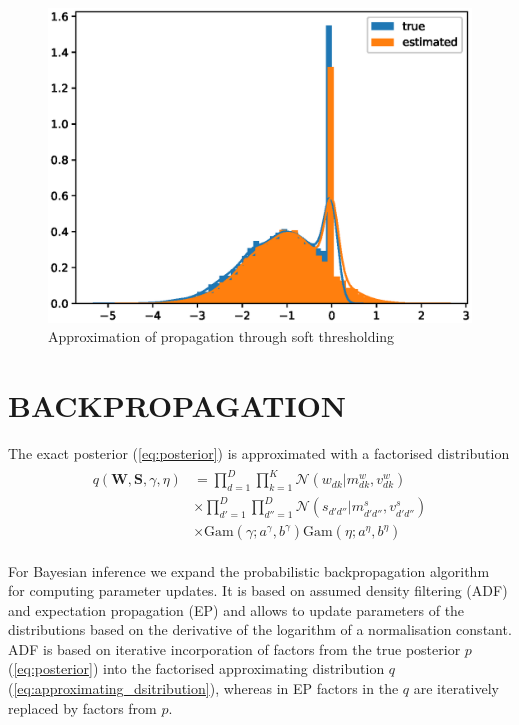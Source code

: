 \documentclass[letterpaper]{article}
\begin{document}
\begin{figure}[t]
\includegraphics[width=\columnwidth]{z_new_testing}
\caption{Approximation of propagation through soft thresholding}
\label{fig:z_new_testing}
\end{figure}


\section{\uppercase{Backpropagation}}
\label{sec:backpropagation}

The exact posterior (\ref{eq:posterior}) is approximated with a factorised distribution
\begin{align}
\label{eq:approximating_dsitribution}
\begin{split}
q(\mathbf{W}, \mathbf{S}, \gamma, \eta) &= \prod_{d=1}^D\prod_{k=1}^K \mathcal{N}(w_{dk} | m^w_{dk}, v^w_{dk}) \\
&\times \prod_{d'=1}^D\prod_{d''=1}^D \mathcal{N}(s_{d'd''} | m^s_{d'd''}, v^s_{d'd''}) \\
&\times \text{Gam}(\gamma; a^\gamma, b^\gamma) \text{Gam}(\eta; a^\eta, b^\eta) 
\end{split}
\end{align}

For Bayesian inference we expand the probabilistic backpropagation algorithm~\citep{hernandez2015probabilistic} for computing parameter updates. It is based on assumed density filtering (ADF) and expectation propagation (EP) and allows to update parameters of the distributions based on the derivative of the logarithm of a normalisation constant. ADF is based on iterative incorporation of factors from the true posterior $p$ (\ref{eq:posterior}) into the factorised approximating distribution $q$ (\ref{eq:approximating_dsitribution}), whereas in EP factors in the $q$ are iteratively replaced by factors from $p$.
\end{document}
